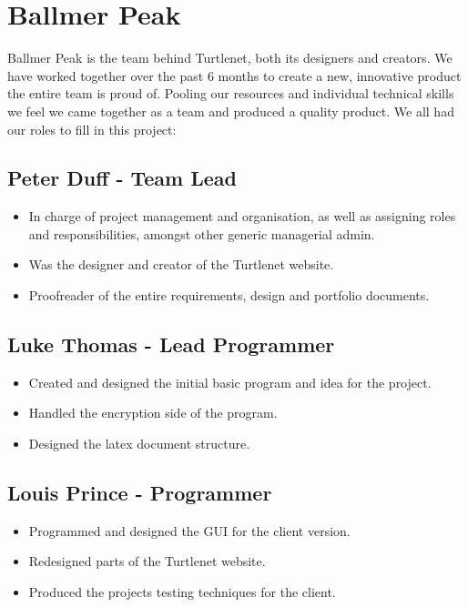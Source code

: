 \section{Ballmer Peak}
Ballmer Peak is the team behind Turtlenet, both its designers and creators.
We have worked together over the past 6 months to create a new, innovative 
product the entire team is proud of. Pooling our resources and individual
technical skills we feel we came together as a team and produced a quality
product. We all had our roles to fill in this project:

\subsection{Peter Duff - Team Lead}
\begin{itemize}
\item In charge of project management and organisation, as well as assigning roles and 
responsibilities, amongst other generic managerial admin.
\item Was the designer and creator of the Turtlenet website.
\item Proofreader of the entire requirements, design and portfolio documents.
\end{itemize}

\subsection{Luke Thomas - Lead Programmer}
\begin{itemize}
\item Created and designed the initial basic program and idea for the project.
\item Handled the encryption side of the program.
\item Designed the latex document structure.
\end{itemize}

\subsection{Louis Prince - Programmer}
\begin{itemize}
\item Programmed and designed the GUI for the client version.
\item Redesigned parts of the Turtlenet website.
\item Produced the projects testing techniques for the client.
\end{itemize}

